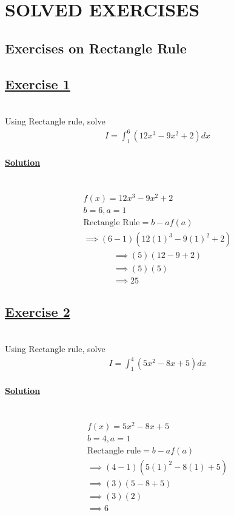 \documentclass[12pt]{report}
\newcommand{\ubt}[1]{\textbf{\underline{#1}}}
\newcommand{\spn}[1]{\\[#1cm]}
\newcommand{\solution}{\subsubsection{\ubt{Solution}}{~}\spn{-1}}
\newcommand{\exercise}[1]{\section*{\ubt{Exercise #1}}{~}\spn{-1}}
\begin{document}
	
	\chapter{SOLVED EXERCISES}
	\section{Exercises on Rectangle Rule}
	\exercise{1}
	Using Rectangle rule, solve
	\begin{eqnarray*}
		I = \int_1^6 (12x^3 - 9x^2 + 2) dx
	\end{eqnarray*}
	\solution
	\begin{gather*}
		f(x) = 12x^3 - 9x^2 + 2\\
		b=6, a=1\\
		\text{Rectangle Rule} = b-af(a)\\
		\implies (6-1)(12(1)^3 - 9(1)^2 + 2)
	\end{gather*}
	\begin{gather*}
		\implies (5)(12-9+2)\\
		\implies (5)(5)\\
		\implies 25
	\end{gather*}
	
	\exercise{2}
	Using Rectangle rule, solve
	\begin{gather*}
		I=\int_1^4(5x^2-8x+5)dx
	\end{gather*}
	\solution
	\begin{gather*}
		f(x) = 5x^2 - 8x + 5\\
		b=4, a=1\\
		\text{Rectangle rule} = b-af(a)\\
		\implies (4-1)(5(1)^2 - 8(1) + 5)\\
		\implies (3)(5-8+5)\\
		\implies (3) (2)\\
		\implies 6
	\end{gather*}
	
\end{document}
